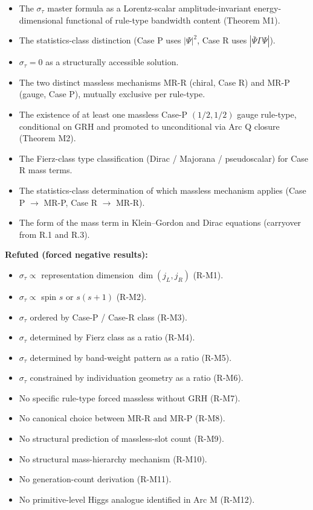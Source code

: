 \documentclass[11pt,a4paper]{article}
\begin{document}
\begin{itemize}[noitemsep]
  \item The $\sigma_\tau$ master formula as a Lorentz-scalar amplitude-invariant energy-dimensional functional of rule-type bandwidth content (Theorem M1).
  \item The statistics-class distinction (Case P uses $|\Psi|^2$, Case R uses $|\bar\Psi\Gamma\Psi|$).
  \item $\sigma_\tau = 0$ as a structurally accessible solution.
  \item The two distinct massless mechanisms MR-R (chiral, Case R) and MR-P (gauge, Case P), mutually exclusive per rule-type.
  \item The existence of at least one massless Case-P $(1/2, 1/2)$ gauge rule-type, conditional on GRH and promoted to unconditional via Arc Q closure (Theorem M2).
  \item The Fierz-class type classification (Dirac / Majorana / pseudoscalar) for Case R mass terms.
  \item The statistics-class determination of which massless mechanism applies (Case P $\to$ MR-P, Case R $\to$ MR-R).
  \item The form of the mass term in Klein--Gordon and Dirac equations (carryover from R.1 and R.3).
\end{itemize}

\textbf{Refuted (forced negative results):}

\begin{itemize}[noitemsep]
  \item $\sigma_\tau \propto$ representation dimension $\dim(j_L, j_R)$ (R-M1).
  \item $\sigma_\tau \propto$ spin $s$ or $s(s+1)$ (R-M2).
  \item $\sigma_\tau$ ordered by Case-P / Case-R class (R-M3).
  \item $\sigma_\tau$ determined by Fierz class as a ratio (R-M4).
  \item $\sigma_\tau$ determined by band-weight pattern as a ratio (R-M5).
  \item $\sigma_\tau$ constrained by individuation geometry as a ratio (R-M6).
  \item No specific rule-type forced massless without GRH (R-M7).
  \item No canonical choice between MR-R and MR-P (R-M8).
  \item No structural prediction of massless-slot count (R-M9).
  \item No structural mass-hierarchy mechanism (R-M10).
  \item No generation-count derivation (R-M11).
  \item No primitive-level Higgs analogue identified in Arc M (R-M12).
\end{itemize}
\end{document}
